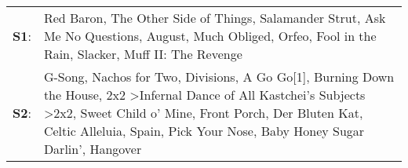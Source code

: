 \begin{supertabular}{p{0.03\textwidth}p{0.92\textwidth}}
 \textbf{S1}:  &                                                                                                                                                                                                                                                                                            Red Baron\textsuperscript{}, \enspace The Other Side of Things\textsuperscript{}, \enspace Salamander Strut\textsuperscript{}, \enspace Ask Me No Questions\textsuperscript{}, \enspace August\textsuperscript{}, \enspace Much Obliged\textsuperscript{}, \enspace Orfeo\textsuperscript{}, \enspace Fool in the Rain\textsuperscript{}, \enspace Slacker\textsuperscript{}, \enspace Muff II: The Revenge\textsuperscript{}  \enspace  \\
 \textbf{S2}:  &  G-Song\textsuperscript{}, \enspace Nachos for Two\textsuperscript{}, \enspace Divisions\textsuperscript{}, \enspace A Go Go[1]\textsuperscript{}, \enspace Burning Down the House\textsuperscript{}, \enspace 2x2\textsuperscript{} \textgreater \enspace Infernal Dance of All Kastchei's Subjects\textsuperscript{} \textgreater \enspace 2x2\textsuperscript{}, \enspace Sweet Child o' Mine\textsuperscript{}, \enspace Front Porch\textsuperscript{}, \enspace Der Bluten Kat\textsuperscript{}, \enspace Celtic Alleluia\textsuperscript{}, \enspace Spain\textsuperscript{}, \enspace Pick Your Nose\textsuperscript{}, \enspace Baby Honey Sugar Darlin'\textsuperscript{}, \enspace Hangover\textsuperscript{}  \enspace  \\
\end{supertabular}
